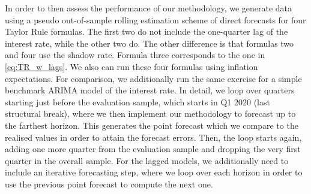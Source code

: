 In order to then assess the performance of our methodology, we generate data using a pseudo out-of-sample rolling estimation scheme of direct forecasts for four Taylor Rule formulas. The first two do not include the one-quarter lag of the interest rate, while the other two do. The other difference is that formulas two and four use the \cite{wu2016measuring} shadow rate. Formula three corresponds to the one in \eqref{eq:TR_w_lags}. We also can run these four formulas using inflation expectations. For comparison, we additionally run the same exercise for a simple benchmark ARIMA model of the interest rate. In detail, we loop over quarters starting just before the evaluation sample, which starts in Q1 2020 (last structural break), where we then implement our methodology to forecast up to the farthest horizon. This generates the point forecast which we compare to the realised values in order to attain the forecast errors. Then, the loop starts again, adding one more quarter from the evaluation sample and dropping the very first quarter in the overall sample. For the lagged models, we additionally need to include an iterative forecasting step, where we loop over each horizon in order to use the previous point forecast to compute the next one.














